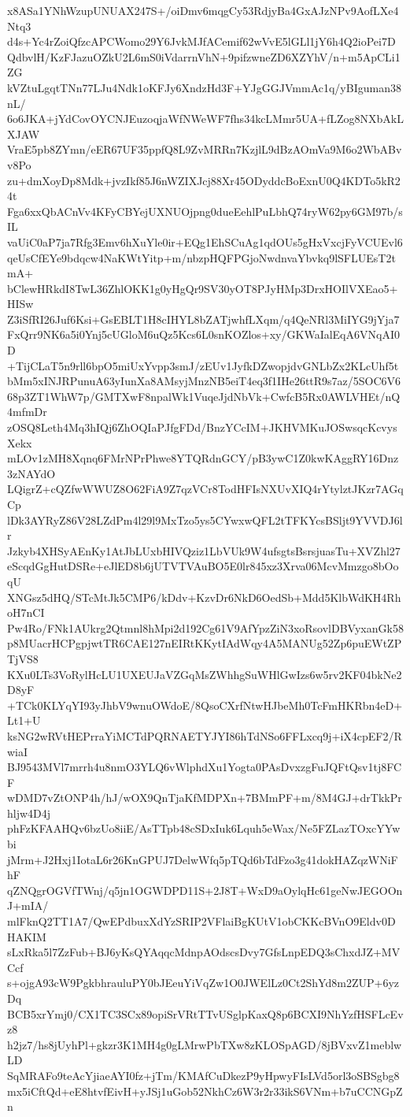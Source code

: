 x8ASa1YNhWzupUNUAX247S+/oiDmv6mqgCy53RdjyBa4GxAJzNPv9AofLXe4Ntq3
d4s+Yc4rZoiQfzcAPCWomo29Y6JvkMJfACemif62wVvE5lGLl1jY6h4Q2ioPei7D
QdbvlH/KzFJazuOZkU2L6mS0iVdarrnVhN+9pifzwneZD6XZYhV/n+m5ApCLi1ZG
kVZtuLgqtTNn77LJu4Ndk1oKFJy6XndzHd3F+YJgGGJVmmAc1q/yBIguman38nL/
6o6JKA+jYdCovOYCNJEuzoqjaWfNWeWF7fhs34kcLMmr5UA+fLZog8NXbAkLXJAW
VraE5pb8ZYmn/eER67UF35ppfQ8L9ZvMRRn7KzjlL9dBzAOmVa9M6o2WbABvv8Po
zu+dmXoyDp8Mdk+jvzIkf85J6nWZIXJcj88Xr45ODyddcBoExnU0Q4KDTo5kR24t
Fga6xxQbACnVv4KFyCBYejUXNUOjpng0dueEehlPuLbhQ74ryW62py6GM97b/sIL
vaUiC0aP7ja7Rfg3Emv6hXuYle0ir+EQg1EhSCuAg1qdOUs5gHxVxcjFyVCUEvl6
qeUsCfEYe9bdqcw4NaKWtYitp+m/nbzpHQFPGjoNwdnvaYbvkq9lSFLUEsT2tmA+
bClewHRkdI8TwL36ZhlOKK1g0yHgQr9SV30yOT8PJyHMp3DrxHOIlVXEao5+HISw
Z3iSfRI26Juf6Ksi+GsEBLT1H8cIHYL8bZATjwhfLXqm/q4QeNRl3MiIYG9jYja7
FxQrr9NK6a5i0Ynj5cUGloM6uQz5Kcs6L0snKOZlos+xy/GKWaIalEqA6VNqAI0D
+TijCLaT5n9rll6bpO5miUxYvpp3smJ/zEUv1JyfkDZwopjdvGNLbZx2KLcUhf5t
bMm5xINJRPunuA63yIunXa8AMsyjMnzNB5eiT4eq3f1IHe26ttR9s7az/5SOC6V6
68p3ZT1WhW7p/GMTXwF8npalWk1VuqeJjdNbVk+CwfcB5Rx0AWLVHEt/nQ4mfmDr
zOSQ8Leth4Mq3hIQj6ZhOQIaPJfgFDd/BnzYCcIM+JKHVMKuJOSwsqcKcvysXekx
mLOv1zMH8Xqnq6FMrNPrPhwe8YTQRdnGCY/pB3ywC1Z0kwKAggRY16Dnz3zNAYdO
LQigrZ+cQZfwWWUZ8O62FiA9Z7qzVCr8TodHFIsNXUvXIQ4rYtylztJKzr7AGqCp
lDk3AYRyZ86V28LZdPm4l29l9MxTzo5ys5CYwxwQFL2tTFKYcsBSljt9YVVDJ6lr
Jzkyb4XHSyAEnKy1AtJbLUxbHIVQziz1LbVUk9W4ufsgtsBsrsjuasTu+XVZhl27
eScqdGgHutDSRe+eJlED8b6jUTVTVAuBO5E0lr845xz3Xrva06McvMmzgo8bOoqU
XNGsz5dHQ/STcMtJk5CMP6/kDdv+KzvDr6NkD6OedSb+Mdd5KlbWdKH4RhoH7nCI
Pw4Ro/FNk1AUkrg2Qtmnl8hMpi2d192Cg61V9AfYpzZiN3xoRsovlDBVyxanGk58
p8MUacrHCPgpjwtTR6CAE127nEIRtKKytIAdWqy4A5MANUg52Zp6puEWtZPTjVS8
KXu0LTs3VoRylHcLU1UXEUJaVZGqMsZWhhgSuWHlGwIzs6w5rv2KF04bkNe2D8yF
+TCk0KLYqYI93yJhbV9wnuOWdoE/8QsoCXrfNtwHJbeMh0TcFmHKRbn4eD+Lt1+U
ksNG2wRVtHEPrraYiMCTdPQRNAETYJYI86hTdNSo6FFLxcq9j+iX4cpEF2/RwiaI
BJ9543MVl7mrrh4u8nmO3YLQ6vWlphdXu1Yogta0PAsDvxzgFuJQFtQsv1tj8FCF
wDMD7vZtONP4h/hJ/wOX9QnTjaKfMDPXn+7BMmPF+m/8M4GJ+drTkkPrhljw4D4j
phFzKFAAHQv6bzUo8iiE/AsTTpb48cSDxIuk6Lquh5eWax/Ne5FZLazTOxcYYwbi
jMrm+J2Hxj1IotaL6r26KnGPUJ7DelwWfq5pTQd6bTdFzo3g41dokHAZqzWNiFhF
qZNQgrOGVfTWnj/q5jn1OGWDPD11S+2J8T+WxD9aOylqHc61geNwJEGOOnJ+mIA/
mlFknQ2TT1A7/QwEPdbuxXdYzSRIP2VFlaiBgKUtV1obCKKcBVnO9Eldv0DHAKIM
sLxRka5l7ZzFub+BJ6yKsQYAqqcMdnpAOdscsDvy7GfsLnpEDQ3sChxdJZ+MVCcf
s+ojgA93cW9PgkbhrauluPY0bJEeuYiVqZw1O0JWElLz0Ct2ShYd8m2ZUP+6yzDq
BCB5xrYmj0/CX1TC3SCx89opiSrVRtTTvUSglpKaxQ8p6BCXI9NhYzfHSFLcEvz8
h2jz7/hs8jUyhPl+gkzr3K1MH4g0gLMrwPbTXw8zKLOSpAGD/8jBVxvZ1meblwLD
SqMRAFo9teAcYjiaeAYI0fz+jTm/KMAfCuDkezP9yHpwyFIsLVd5orl3oSBSgbg8
mx5iCftQd+eE8htvfEivH+yJSj1uGob52NkhCz6W3r2r33ikS6VNm+b7uCCNGpZn
